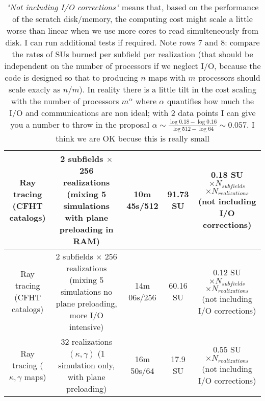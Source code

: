 \documentclass[11pt]{article}
\begin{document}
\begin{table}[h!]
\begin{center}
\begin{tabular}{c|c|c|c|c}
\pbox{20cm}{Ray tracing \\ (CFHT catalogs)} & \pbox{20cm}{2 subfields $\times$ 256 realizations \\ (mixing 5 simulations \\with plane \\preloading in RAM)} & 10m 45s/512 & 91.73 SU & \pbox{20cm}{0.18 SU $\times N_{subfields}$\\ $\times N_{realizations}$\\ (not including \\ I/O corrections)} \\ \hline
\pbox{20cm}{Ray tracing \\(CFHT catalogs)} & \pbox{20cm}{2 subfields $\times$ 256 realizations\\ (mixing 5 simulations\\no plane preloading, \\more I/O intensive)} & 14m 06s/256 & 60.16 SU & \pbox{20cm}{0.12 SU $\times N_{subfields}$\\ $\times N_{realizations}$\\ (not including \\ I/O corrections)} \\ \hline
\pbox{20cm}{Ray tracing\\ ($\kappa,\gamma$ maps)} & \pbox{20cm}{32 realizations $(\kappa,\gamma)$ \\ (1 simulation only, \\ with plane preloading)} & 16m 50s/64 & 17.9 SU & \pbox{20cm}{0.55 SU $\times N_{realizations}$\\ (not including \\ I/O corrections)} \\ \hline
\end{tabular}
\end{center}
\caption{\textit{"Not including I/O corrections"} means that, based on the performance of the scratch disk/memory, the computing cost might scale a little worse than linear when we use more cores to read simulteneously from disk. I can run additional tests if required. Note rows 7 and 8: compare the rates of SUs burned per subfield per realization (that should be independent on the number of processors if we neglect I/O, because the code is designed so that to producing $n$ maps with $m$ processors should scale exacly as $n/m$). In reality there is a little tilt in the cost scaling with the number of processors $m^\alpha$ where $\alpha$ quantifies how much the I/O and communications are non ideal; with 2 data points I can give you a number to throw in the proposal $\alpha\sim\frac{\log 0.18 - \log 0.16}{\log 512 - \log 64}\sim 0.057$. I think we are OK becuse this is really small}
\end{table}
\end{document}
